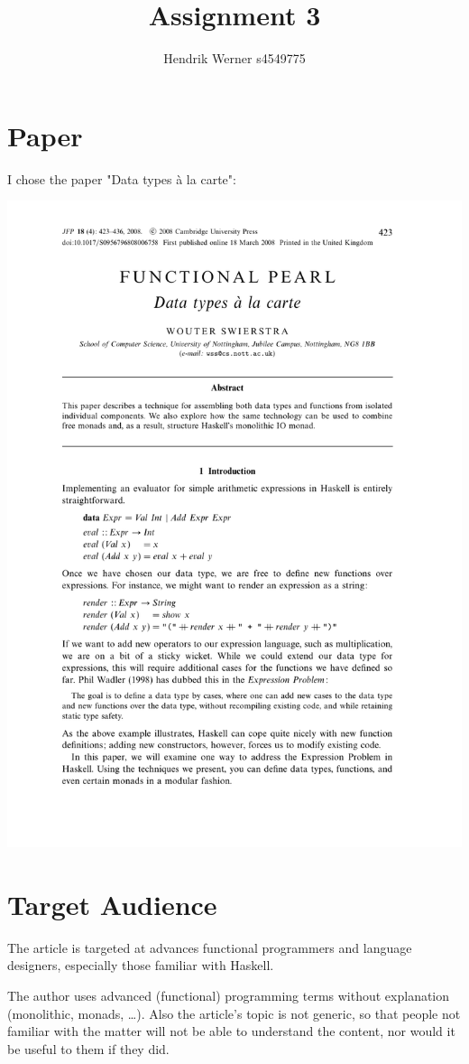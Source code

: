 \documentclass[12pt, a4paper]{article}
\title{Assignment 3}
\author{Hendrik Werner s4549775}
\begin{document}
\maketitle

\section{Paper}
I chose the paper "Data types à la carte":

\includegraphics[page=1]{DataTypesALaCarte}

\section{Target Audience}
The article is targeted at advances functional programmers and language designers, especially those familiar with Haskell.

The author uses advanced (functional) programming terms without explanation (monolithic, monads, \dots). Also the article's topic is not generic, so that people not familiar with the matter will not be able to understand the content, nor would it be useful to them if they did.
\end{document}
